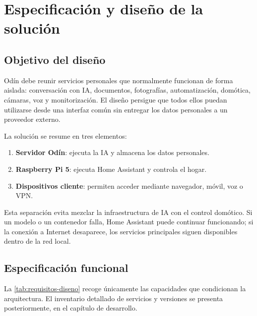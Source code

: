 \chapter{Especificación y diseño de la solución}

\section{Objetivo del diseño}
Odín debe reunir servicios personales que normalmente funcionan de forma
aislada: conversación con IA, documentos, fotografías, automatización,
domótica, cámaras, voz y monitorización. El diseño persigue que todos ellos
puedan utilizarse desde una interfaz común sin entregar los datos personales a
un proveedor externo.

La solución se resume en tres elementos:

\begin{enumerate}
  \item \textbf{Servidor Odín}: ejecuta la IA y almacena los datos personales.
  \item \textbf{Raspberry Pi 5}: ejecuta Home Assistant y controla el hogar.
  \item \textbf{Dispositivos cliente}: permiten acceder mediante navegador,
        móvil, voz o VPN.
\end{enumerate}

Esta separación evita mezclar la infraestructura de IA con el control
domótico. Si un modelo o un contenedor falla, Home Assistant puede continuar
funcionando; si la conexión a Internet desaparece, los servicios principales
siguen disponibles dentro de la red local.

\section{Especificación funcional}
La \cref{tab:requisitos-diseno} recoge únicamente las capacidades que
condicionan la arquitectura. El inventario detallado de servicios y versiones
se presenta posteriormente, en el capítulo de desarrollo.

